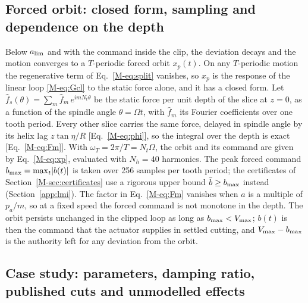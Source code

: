 \subsection{Forced orbit: closed form, sampling and dependence on the depth}\label{supp:std-model-orbit}

Below $a_{\lim}$ and with the command inside the clip, the deviation decays and the motion converges to a $T$-periodic forced orbit $x_p(t)$. On any $T$-periodic motion the regenerative term of Eq.~\eqref{M-eq:split} vanishes, so $x_p$ is the response of the linear loop \eqref{M-eq:Gcl} to the static force alone, and it has a closed form. Let $\hat f_s(\theta)=\sum_m\hat f_m\,e^{imN_t\theta}$ be the static force per unit depth of the slice at $z=0$, as a function of the spindle angle $\theta=\Omega t$, with $\hat f_m$ its Fourier coefficients over one tooth period. Every other slice carries the same force, delayed in spindle angle by its helix lag $z\tan\eta/R$ [Eq.~\eqref{M-eq:phi}], so the integral over the depth is exact [Eq.~\eqref{M-eq:Fm}]. With $\omega_T=2\pi/T=N_t\Omega$, the orbit and its command are given by Eq.~\eqref{M-eq:xp}, evaluated with $N_h=40$ harmonics. The peak forced command $b_{\max}=\max_t\lvert b(t)\rvert$ is taken over 256 samples per tooth period; the certificates of Section~\ref{M-sec:certificates} use a rigorous upper bound $\bar b\ge b_{\max}$ instead (Section~\ref{app:lmi}). The factor in Eq.~\eqref{M-eq:Fm} vanishes when $a$ is a multiple of $p_a/m$, so at a fixed speed the forced command is not monotone in the depth. The orbit persists unchanged in the clipped loop as long as $b_{\max}<V_{\max}$; $b(t)$ is then the command that the actuator supplies in settled cutting, and $V_{\max}-b_{\max}$ is the authority left for any deviation from the orbit.

\subsection{Case study: parameters, damping ratio, published cuts and unmodelled effects}\label{supp:std-model-case}

